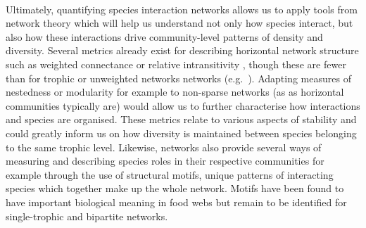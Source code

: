 \documentclass[a4,12pt]{article}
\begin{document}
    \paragraph{}
    Ultimately, quantifying species interaction networks allows us to apply tools from network theory which will help us understand not only how species interact, but also how these interactions drive community-level patterns of density and diversity. Several metrics already exist for describing horizontal network structure such as weighted connectance \parencite{Ulanowicz1991} or relative intransitivity \parencite{Laird2006a}, though these are fewer than for trophic or unweighted networks networks (e.g.\ \cite{Bersier2002, Delmas2019}). Adapting measures of nestedness or modularity for example to non-sparse networks (as as horizontal communities typically are) would allow us to further characterise how interactions and species are organised. These metrics relate to various aspects of stability and could greatly inform us on how diversity is maintained between species belonging to the same trophic level. Likewise, networks also provide several ways of measuring and describing species roles in their respective communities \parencite{Cirtwill2018a} for example through the use of structural motifs, unique patterns of interacting species which together make up the whole network. Motifs have been found to have important biological meaning in food webs \parencite{Bascompte2005a} but remain to be identified for single-trophic and bipartite networks. 

     
\end{document}
